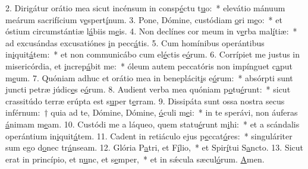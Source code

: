 2. Dirigátur orátio mea sicut incénsum in consp\uline{é}ctu t\uline{u}o:~* elevátio mánuum meárum sacrifícium v\uline{e}spert\uline{í}num.
3. Pone, Dómine, custódiam \uline{o}ri m\uline{e}o:~* et óstium circumstántiæ l\uline{á}biis m\uline{e}is.
4. Non declínes cor meum in v\uline{e}rba mal\uline{í}tiæ:~* ad excusándas excusatiónes \uline{i}n pecc\uline{á}tis.
5. Cum homínibus operántibus in\uline{i}quit\uline{á}tem:~* et non communicábo cum el\uline{é}ctis e\uline{ó}rum.
6. Corrípiet me justus in misericórdia, et \uline{i}ncrep\uline{á}bit me:~* óleum autem peccatóris non impínguet c\uline{a}put m\uline{e}um.
7. Quóniam adhuc et orátio mea in beneplácit\uline{i}s e\uline{ó}rum:~* absórpti sunt juncti petræ júdic\uline{e}s e\uline{ó}rum.
8. Audient verba mea quóniam p\uline{o}tu\uline{é}runt:~* sicut crassitúdo terræ erúpta est s\uline{u}per t\uline{e}rram.
9. Dissipáta sunt ossa nostra secus inférnum:~† quia ad te, Dómine, Dómine, \uline{ó}culi m\uline{e}i:~* in te sperávi, non áuferas \uline{á}nimam m\uline{e}am.
10. Custódi me a láqueo, quem statu\uline{é}runt m\uline{i}hi:~* et a scándalis operántium in\uline{i}quit\uline{á}tem.
11. Cadent in retiáculo ejus p\uline{e}ccat\uline{ó}res:~* singuláriter sum ego d\uline{o}nec tr\uline{á}nseam.
12. Glória P\uline{a}tri, et F\uline{í}lio,~* et Spir\uline{í}tui S\uline{a}ncto.
13. Sicut erat in princípio, et n\uline{u}nc, et s\uline{e}mper,~* et in sǽcula sæcul\uline{ó}rum. \uline{A}men.
